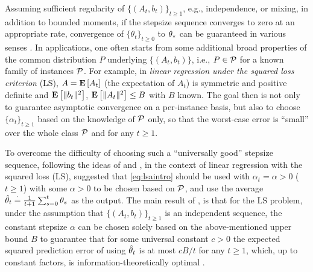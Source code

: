 Assuming sufficient regularity of $\{(A_t,b_t)\}_{t\ge 1}$, e.g., independence, or mixing, in addition to bounded moments, if the stepsize sequence converges to zero at an appropriate rate,
convergence of $\{\theta_t\}_{t\ge 0}$ to $\theta_*$ can be guaranteed in various senses \cite{bemepri90,borkarbook}. 
In applications, one often starts from some additional broad properties of the common distribution
$P$ underlying $\{(A_t,b_t)\}$, i.e., $P\in \mathcal{P}$ for a known family of instances $\mathcal{P}$.
For example, in \emph{linear regression under the squared loss criterion} (LS), 
$A= \mathbf{E}\left[A_t\right]$ (the expectation of $A_t$) 
is symmetric and positive definite and $\mathbf{E}\left[\| b_t\|^2\right]$, 
$\mathbf{E}\left[\| A_t\|^2\right]\le B$ with $B$ known.
The goal then is not only to guarantee asymptotic convergence on a per-instance basis, 
but also to choose $\{\alpha_t\}_{t\ge 1}$ based on the knowledge of $\mathcal{P}$ only, 
so that the worst-case error is  ``small'' 
over the whole class $\mathcal{P}$ and for any  $t\ge 1$.

To overcome the difficulty of choosing such a ``universally good'' stepsize sequence,
following the ideas of \citet{ruppert} and \citet{polyak-judisky},
in the context of linear regression with the squared loss (LS),
\citet{bach-moulines} suggested that
\eqref{eq:lsaintro} should be used with $\alpha_t=\alpha>0$ ($t\ge 1$) 
with some $\alpha>0$ to be chosen based on $\mathcal{P}$, 
and use the average $\hat{\theta}_t\stackrel{\cdot}{=}\frac{1}{t+1}\sum_{s=0}^t \theta_s$ as the output. 
The main result of 
\citet{bach-moulines}, 
is that for the LS problem, 
under the assumption that $\{(A_t,b_t)\}_{t\ge 1}$ is an independent sequence, 
the constant stepsize $\alpha$ can be chosen solely based on the above-mentioned 
upper bound $B$ 
to guarantee that for some universal constant $c>0$
the expected squared prediction error of using $\hat{\theta}_t$ is at most $c B/t$ for any $t\ge 1$,
which, up to constant factors, is information-theoretically optimal \cite{nemirovski,agarwal,yudin}. 

